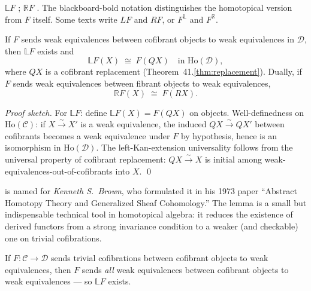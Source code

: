 \begin{howtosay}
$\mathbb{L} F$ ;
$\mathbb{R} F$ . The
blackboard-bold notation distinguishes the homotopical version from $F$
itself. Some texts write $LF$ and $RF$, or $F^{\mathbb{L}}$ and $F^{\mathbb{R}}$.
\end{howtosay}

\begin{theorem}
\label{thm:derived-pointwise}
If $F$ sends weak equivalences between cofibrant objects to weak
equivalences in $\mathcal{D}$, then $\mathbb{L} F$ exists and
\begin{equation*}
  \mathbb{L} F (X) \;\cong\; F(Q X) \quad \text{in } \mathrm{Ho}(\mathcal{D}),
\end{equation*}
where $Q X$ is a cofibrant replacement (Theorem~41.\ref{thm:replacement}).
Dually, if $F$ sends weak equivalences between fibrant objects to weak
equivalences,
\begin{equation*}
  \mathbb{R} F (X) \;\cong\; F(R X).
\end{equation*}
\end{theorem}

\begin{proof}[Proof sketch]
For $\mathbb{L}F$: define $\mathbb{L}F (X) = F(Q X)$ on objects.
Well-definedness on $\mathrm{Ho}(\mathcal{C})$: if $X \xrightarrow{\sim} X'$
is a weak equivalence, the induced $Q X \xrightarrow{\sim} Q X'$ between
cofibrants becomes a weak equivalence under $F$ by hypothesis, hence is
an isomorphism in $\mathrm{Ho}(\mathcal{D})$. The left-Kan-extension
universality follows from the universal property of cofibrant replacement:
$Q X \xrightarrow{\sim} X$ is initial among weak-equivalences-out-of-cofibrants
into $X$. \qed
\end{proof}

\begin{nameorigin}
 is named for \emph{Kenneth S.\ Brown}, who
formulated it in his 1973 paper ``Abstract Homotopy Theory and
Generalized Sheaf Cohomology.'' The lemma is a small but indispensable
technical tool in homotopical algebra: it reduces the existence of
derived functors from a strong invariance condition to a weaker (and
checkable) one on trivial cofibrations.
\end{nameorigin}

\begin{lemma}
\label{lem:ken-brown}
If $F : \mathcal{C} \to \mathcal{D}$ sends trivial cofibrations between
cofibrant objects to weak equivalences, then $F$ sends \emph{all} weak
equivalences between cofibrant objects to weak equivalences — so
$\mathbb{L} F$ exists.
\end{lemma}

